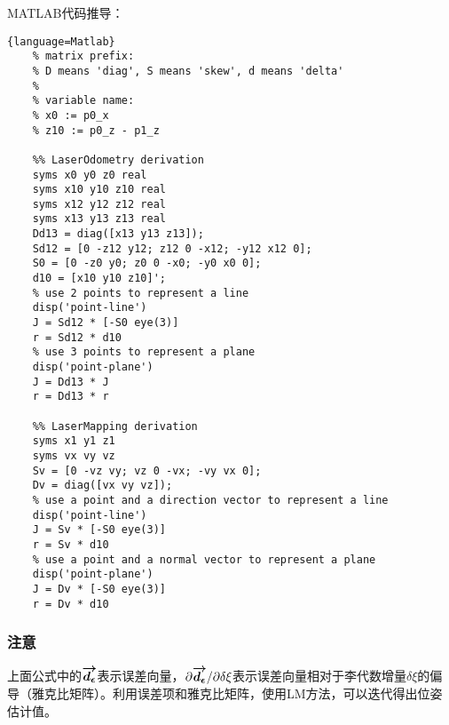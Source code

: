 \documentclass{ctexart}
\begin{document}
	\par MATLAB代码推导：
	\small
	\begin{lstlisting}{language=Matlab}
	% matrix prefix:
	% D means 'diag', S means 'skew', d means 'delta'
	%
	% variable name:
	% x0 := p0_x
	% z10 := p0_z - p1_z
	
	%% LaserOdometry derivation
	syms x0 y0 z0 real
	syms x10 y10 z10 real
	syms x12 y12 z12 real
	syms x13 y13 z13 real
	Dd13 = diag([x13 y13 z13]);
	Sd12 = [0 -z12 y12; z12 0 -x12; -y12 x12 0];
	S0 = [0 -z0 y0; z0 0 -x0; -y0 x0 0];
	d10 = [x10 y10 z10]';
	% use 2 points to represent a line
	disp('point-line')
	J = Sd12 * [-S0 eye(3)]
	r = Sd12 * d10
	% use 3 points to represent a plane
	disp('point-plane')
	J = Dd13 * J
	r = Dd13 * r
	
	%% LaserMapping derivation
	syms x1 y1 z1
	syms vx vy vz
	Sv = [0 -vz vy; vz 0 -vx; -vy vx 0];
	Dv = diag([vx vy vz]);
	% use a point and a direction vector to represent a line
	disp('point-line')
	J = Sv * [-S0 eye(3)]
	r = Sv * d10
	% use a point and a normal vector to represent a plane
	disp('point-plane')
	J = Dv * [-S0 eye(3)]
	r = Dv * d10
	\end{lstlisting}
	
	\subsubsection{注意}
	上面公式中的$\boldmath\overrightarrow{d_\epsilon}\unboldmath$表示误差向量，${\partial \boldmath\overrightarrow{d_{\epsilon}}\unboldmath}/{\partial\delta\xi}$表示误差向量相对于李代数增量$\delta\xi$的偏导（雅克比矩阵）。利用误差项和雅克比矩阵，使用LM方法，可以迭代得出位姿估计值。
	
\end{document}
